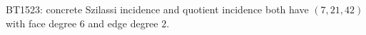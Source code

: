 \begin{center}\small
BT1523: concrete Szilassi incidence and quotient incidence both have $(7,21,42)$ with face degree $6$ and edge degree $2$.
\end{center}
